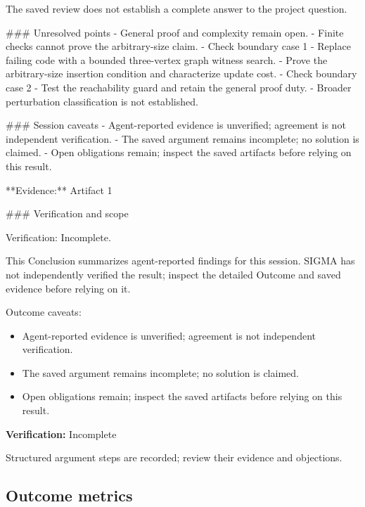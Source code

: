 \documentclass[11pt]{article}
\begin{document}
The saved review does not establish a complete answer to the project question.

\#\#\# Unresolved points
- General proof and complexity remain open.
- Finite checks cannot prove the arbitrary-size claim.
- Check boundary case 1
- Replace failing code with a bounded three-vertex graph witness search.
- Prove the arbitrary-size insertion condition and characterize update cost.
- Check boundary case 2
- Test the reachability guard and retain the general proof duty.
- Broader perturbation classification is not established.

\#\#\# Session caveats
- Agent-reported evidence is unverified; agreement is not independent verification.
- The saved argument remains incomplete; no solution is claimed.
- Open obligations remain; inspect the saved artifacts before relying on this result.

**Evidence:** Artifact 1

\#\#\# Verification and scope

Verification: Incomplete.

This Conclusion summarizes agent-reported findings for this session. SIGMA has not independently verified the result; inspect the detailed Outcome and saved evidence before relying on it.\par
Outcome caveats:\par
\begin{itemize}
\item Agent-reported evidence is unverified; agreement is not independent verification.
\item The saved argument remains incomplete; no solution is claimed.
\item Open obligations remain; inspect the saved artifacts before relying on this result.
\end{itemize}
\textbf{Verification:} Incomplete\par
Structured argument steps are recorded; review their evidence and objections.\par
\subsection{Outcome metrics}
\end{document}
